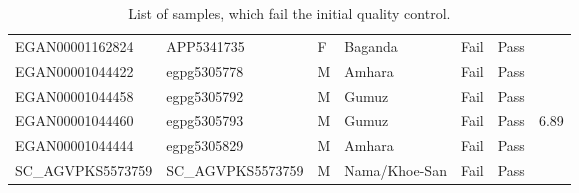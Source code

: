 \begin{table}[htp]
\begin{tabular}{|l|l|l|l|l|l|l|}
EGAN00001162824 & APP5341735 & F & Baganda & Fail & Pass &  \\
EGAN00001044422 & egpg5305778 & M & Amhara & Fail & Pass & \\
EGAN00001044458 & egpg5305792 & M & Gumuz & Fail & Pass & \\
EGAN00001044460 & egpg5305793 & M & Gumuz & Fail & Pass & 6.89 \\
EGAN00001044444 & egpg5305829 & M & Amhara & Fail & Pass & \\
SC\_AGVPKS5573759 & SC\_AGVPKS5573759 & M & Nama/Khoe-San & Fail & Pass & \\
\hline
\end{tabular}
\caption{List of samples, which fail the initial quality control.}
\label{table:failQC}
\end{table}